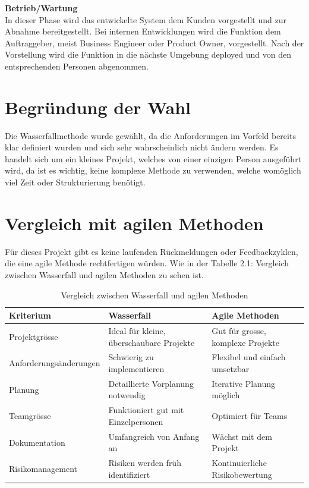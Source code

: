 \vspace{1em}
\textbf{Betrieb/Wartung}\\
In dieser Phase wird das entwickelte System dem Kunden vorgestellt und zur Abnahme bereitgestellt. Bei internen Entwicklungen wird die Funktion dem Auftraggeber, meist Business Engineer oder Product Owner, vorgestellt. Nach der Vorstellung wird die Funktion in die nächste Umgebung deployed und von den entsprechenden Personen abgenommen.

\section{Begründung der Wahl}
Die Wasserfallmethode wurde gewählt, da die Anforderungen im Vorfeld bereits klar definiert wurden und sich sehr wahrscheinlich nicht ändern werden. Es handelt sich um ein kleines Projekt, welches von einer einzigen Person ausgeführt wird, da ist es wichtig, keine komplexe Methode zu verwenden, welche womöglich viel Zeit oder Strukturierung benötigt.

\section{Vergleich mit agilen Methoden}
Für dieses Projekt gibt es keine laufenden Rückmeldungen oder Feedbackzyklen, die eine agile Methode rechtfertigen würden. Wie in der Tabelle 2.1: Vergleich zwischen Wasserfall und agilen Methoden zu sehen ist. 

\begin{table}[h]
\caption{Vergleich zwischen Wasserfall und agilen Methoden}
\label{tab:methodenvergleich}
\centering
\renewcommand{\arraystretch}{1.5}
\begin{tabular}{|l|p{5cm}|p{5cm}|}
\hline
\textbf{Kriterium} & \textbf{Wasserfall} & \textbf{Agile Methoden} \\
\hline
Projektgrösse & Ideal für kleine, überschaubare Projekte & Gut für grosse, komplexe Projekte \\
\hline
Anforderungsänderungen & Schwierig zu implementieren & Flexibel und einfach umsetzbar \\
\hline
Planung & Detaillierte Vorplanung notwendig & Iterative Planung möglich \\
\hline
Teamgrösse & Funktioniert gut mit Einzelpersonen & Optimiert für Teams \\
\hline
Dokumentation & Umfangreich von Anfang an & Wächst mit dem Projekt \\
\hline
Risikomanagement & Risiken werden früh identifiziert & Kontinuierliche Risikobewertung \\
\hline
\end{tabular}
\end{table}

